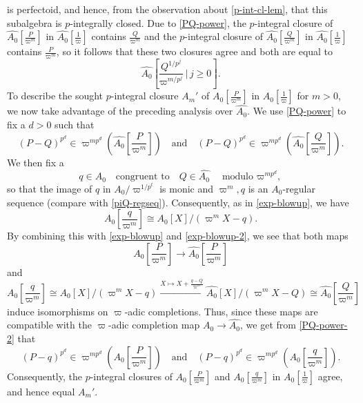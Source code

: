 \documentclass[11pt, reqno]{amsart}
\newcommand{\ra}{\rightarrow}
\newcommand{\wh}{\widehat}
\newcommand{\xra}{\xrightarrow}
\providecommand{\f}[2]{\frac{#1}{#2}}
\newcommand{\x}{\text}
\providecommand{\qxq}[1]{\quad\text{#1}\quad}
\newcommand{\q}{\quad}
\newcommand{\tst}{\textstyle}
\newcommand{\be}{\begin{equation}}
\newcommand{\ee}{\end{equation}}
\numberwithin{equation}{numberingbase}
\theoremstyle{thms}
\theoremstyle{claims}
\theoremstyle{defs}
\theoremstyle{thms}
\theoremstyle{defs}
\theoremstyle{subsection-tweak}
\theoremstyle{subsection-tweak}
\begin{document}
is perfectoid, and hence, from the observation about \eqref{p-int-cl-lem}, that this subalgebra is $p$-integrally closed. Due to \eqref{PQ-power}, the $p$-integral closure of $\wh{A_0}[\f{P}{\varpi^m}]$ in $\wh{A_0}[\f{1}{\varpi}]$ contains $\f{Q}{\varpi^m}$ and the $p$-integral closure of $\wh{A_0}[\f{Q}{\varpi^m}]$ in $\wh{A_0}[\f{1}{\varpi}]$ contains $\f{P}{\varpi^m}$, so it follows that these two closures agree and both are equal to 
\[
\tst \wh{A_0}[\f{Q^{1/p^j}}{\varpi^{m/p^{j}}}\, |\, j \ge 0].
\]
To describe the sought $p$-integral closure $A_m'$ of $A_0[\f{P}{\varpi^m}]$ in $A_0[\f{1}{\varpi}]$ for $m > 0$, we now take advantage of the preceding analysis over $\wh{A_0}$. We use \eqref{PQ-power} to fix a $d > 0$ such that 
\be \label{PQ-power-2}
\tst (P - Q)^{p^d} \in \varpi^{mp^d}(\wh{A_0}[\f{P}{\varpi^m}]) \q \x{and} \q (P - Q)^{p^d} \in \varpi^{mp^d}(\wh{A_0}[\f{Q}{\varpi^m}]).
\ee
We then fix a 
\[
q \in A_0 \qxq{congruent to}  Q \in \wh{A_0} \q \x{modulo $\varpi^{mp^d}$,}
\]
so that the image of $q$ in $A_0/\varpi^{1/p^t}$ is monic and $\varpi^m, q$ is an $A_0$-regular sequence (compare with \eqref{piQ-regseq}). Consequently, as in \eqref{exp-blowup}, we have 
\[
\tst A_0[\f{q}{\varpi^m}] \cong A_0[X]/(\varpi^mX - q).
\]
By combining this with \eqref{exp-blowup} and \eqref{exp-blowup-2}, we see that both maps
\[
\tst A_0[\f{P}{\varpi^m}] \ra \wh{A_0}[\f{P}{\varpi^m}]
\]
and
\[
\tst A_0[\f{q}{\varpi^m}] \cong A_0[X]/(\varpi^mX - q) \xra{X \mapsto X + \f{q - Q}{\varpi^m}} \wh{A_0}[X]/(\varpi^mX - Q) \cong \wh{A_0}[\f{Q}{\varpi^m}]
\]
induce isomorphisms on $\varpi$-adic completions. Thus, since these maps are compatible with the $\varpi$-adic completion map $A_0 \ra \wh{A_0}$, we get from \eqref{PQ-power-2} that %
\[
\tst (P - q)^{p^d} \in \varpi^{mp^d}(A_0[\f{P}{\varpi^m}]) \q \x{and} \q (P - q)^{p^d} \in \varpi^{mp^d}(A_0[\f{q}{\varpi^m}]).
\]
Consequently, the $p$-integral closures of $A_0[\f{P}{\varpi^m}]$ and $A_0[\f{q}{\varpi^m}]$ in $A_0[\f{1}{\varpi}]$ agree, and hence equal $A_m'$. 
\end{document}
